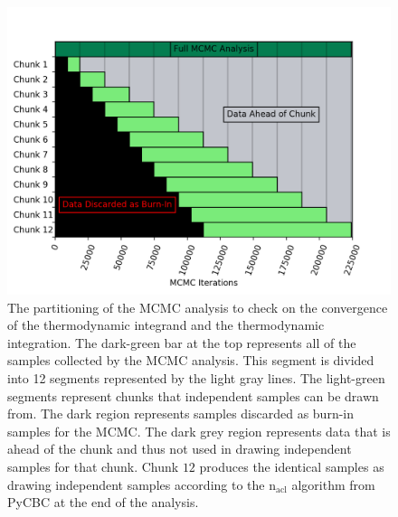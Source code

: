 \begin{figure}[th]
\centering
\includegraphics[width=0.9\columnwidth]{figs/chapter6/convergence_segmentation_lvc_sim.png}
\caption{The partitioning of the MCMC analysis to check on the convergence of the thermodynamic integrand and the thermodynamic integration. The dark-green bar at the top represents all of the samples collected by the MCMC analysis. This segment is divided into 12 segments represented by the light gray lines. The light-green segments represent chunks that independent samples can be drawn from. The dark region represents samples discarded as burn-in samples for the MCMC. The dark grey region represents data that is ahead of the chunk and thus not used in drawing independent samples for that chunk. Chunk $12$ produces the identical samples as drawing independent samples according to the $\mathrm{n_{acl}}$ algorithm from PyCBC at the end of the analysis.}
\label{fig:nacl_segments}
\end{figure}

